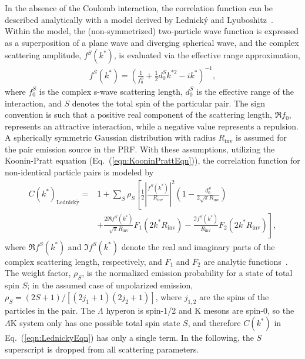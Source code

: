 \documentclass[ALICE,manyauthors]{cernphprep}
\newcommand{\Lam}{$\Lambda$\xspace}
\newcommand{\LamK}{$\Lambda$K\xspace}
\begin{document}
In the absence of the Coulomb interaction, the correlation function can be described analytically with a model derived by Lednick\'y and Lyuboshitz~\cite{Lednicky:82}.
Within the model, the (non-symmetrized) two-particle wave function is expressed as a superposition of a plane wave and diverging spherical wave, and the complex scattering amplitude, $f^{S}(k^{*})$, is evaluated via the effective range approximation,
\begin{equation}
\begin{aligned}
f^{S}(k^{*}) = \left( \frac{1}{f^{S}_{0}} + \frac{1}{2}d^{S}_{0}k^{*2} - ik^{*} \right)^{-1},
\end{aligned}
\label{eqn:ScatteringParam}
\end{equation}
where $f^{S}_{0}$ is the complex s-wave scattering length, $d^{S}_{0}$ is the effective range of the interaction, and $S$ denotes the total spin of the particular pair.
The sign convention is such that a positive real component of the scattering length, $\Re f_{0}$, represents an attractive interaction, while a negative value represents a repulsion.
A spherically symmetric Gaussian distribution with radius $R_{\mathrm{inv}}$  is assumed for the pair emission source in the PRF.
With these assumptions, utilizing the Koonin-Pratt equation (Eq.~(\ref{eqn:KooninPrattEqn})), the correlation function for non-identical particle pairs is modeled by~\cite{Lednicky:82}
\begin{equation}
\begin{aligned}
C(k^{*})_{\mathrm{Lednick\acute{y}}} = &1 + \sum_{S}\rho_{S}\left[\frac{1}{2}\left|\frac{f^{S}(k^{*})}{R_{\mathrm{inv}}}\right|^2\left(1-\frac{d^{S}_{0}}{2\sqrt{\pi}R_{\mathrm{inv}}}\right) \right. \\
&+ \left. \frac{2\Re f^{S}(k^{*})}{\sqrt{\pi}R_{\mathrm{inv}}}F_{1}(2k^{*}R_{\mathrm{inv}})-\frac{\Im f^{S}(k^{*})}{R_{\mathrm{inv}}}F_{2}(2k^{*}R_{\mathrm{inv}})\right],
\end{aligned}  
\label{eqn:LednickyEqn}
\end{equation}
where $\Re f^{S}(k^{*})$ and $\Im f^{S}(k^{*})$ denote the real and imaginary parts of the complex scattering length, respectively, and $F_{1}$ and $F_{2}$ are analytic functions~\cite{Lednicky:82}.
The weight factor, $\rho_{S}$, is the normalized emission probability for a state of total spin $S$; in the assumed case of unpolarized emission, $\rho_{S} = (2S+1)/[(2j_{1}+1)(2j_{2}+1)]$, where $j_{1,2}$ are the spins of the particles in the pair.
The \Lam hyperon is spin-1/2 and K mesons are spin-0, so the \LamK system only has one possible total spin state $S$, and therefore $C(k^{*})$ in Eq.~(\ref{eqn:LednickyEqn}) has only a single term.
In the following, the $S$ superscript is dropped from all scattering parameters.
\end{document}
